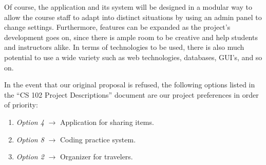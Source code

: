 \documentclass[12pt]{article}
\begin{document}
    \noindent Of course, the application and its system will be designed in a modular
    way to allow the course staff to adapt into distinct situations by using
    an admin panel to change settings. Furthermore, features can be expanded
    as the project's development goes on, since there is ample room to be
    creative and help students and instructors alike. In terms of
    technologies to be used, there is also much potential to use a wide
    variety such as web technologies, databases, GUI's, and so on.
    
    \noindent In the event that our original proposal is refused, the following
    options listed in the ``CS 102 Project Descriptions'' document are our
    project preferences in order of priority:
    
    \begin{enumerate}
        \itemsep1pt\parskip0pt
        \item \textit{Option 4} $\rightarrow$ \textnormal{Application for sharing items.}
        \item \textit{Option 8} $\rightarrow$ \textnormal{Coding practice system.}
        \item \textit{Option 2} $\rightarrow$ \textnormal{Organizer for travelers.}
    \end{enumerate}
    
\end{document}
